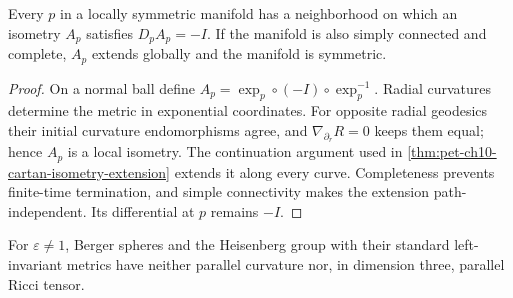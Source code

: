 \begin{theorem}
  \label{thm:pet-ch10-cartan-local-symmetry}

  Every $p$ in a locally symmetric manifold has a neighborhood on which an
  isometry $A_p$ satisfies $D_pA_p=-I$. If the manifold is also simply
  connected and complete, $A_p$ extends globally and the manifold is
  symmetric.
\end{theorem}
\begin{proof}
  \sketch
  On a normal ball define $A_p=\exp_p\circ(-I)\circ\exp_p^{-1}$. Radial
  curvatures determine the metric in exponential coordinates. For opposite
  radial geodesics their initial curvature endomorphisms agree, and
  $\nabla_{\partial_r}R=0$ keeps them equal; hence $A_p$ is a local isometry.
  The continuation argument used in
  \cref{thm:pet-ch10-cartan-isometry-extension} extends it along every curve.
  Completeness prevents finite-time termination, and simple connectivity makes
  the extension path-independent. Its differential at $p$ remains $-I$.
\end{proof}

\begin{remark}
  \label{rem:pet-ch10-non-locally-symmetric-examples}

  For $\varepsilon\ne1$, Berger spheres and the Heisenberg group with their
  standard left-invariant metrics have neither parallel curvature nor, in
  dimension three, parallel Ricci tensor.
\end{remark}

